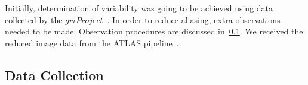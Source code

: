 \documentclass[aps,prb,twocolumn,superscriptaddress]{revtex4-1}
\begin{document}
Initially, determination of variability was going to be achieved using data collected by the $gri Project$~\cite{gri}.  %
In order to reduce aliasing, extra observations needed to be made.  Observation procedures are discussed in~\cref{sec:data}.
We received the reduced image data from the ATLAS pipeline~\cite{gri}.








\subsection{Data Collection}\label{sec:data}

\end{document}
